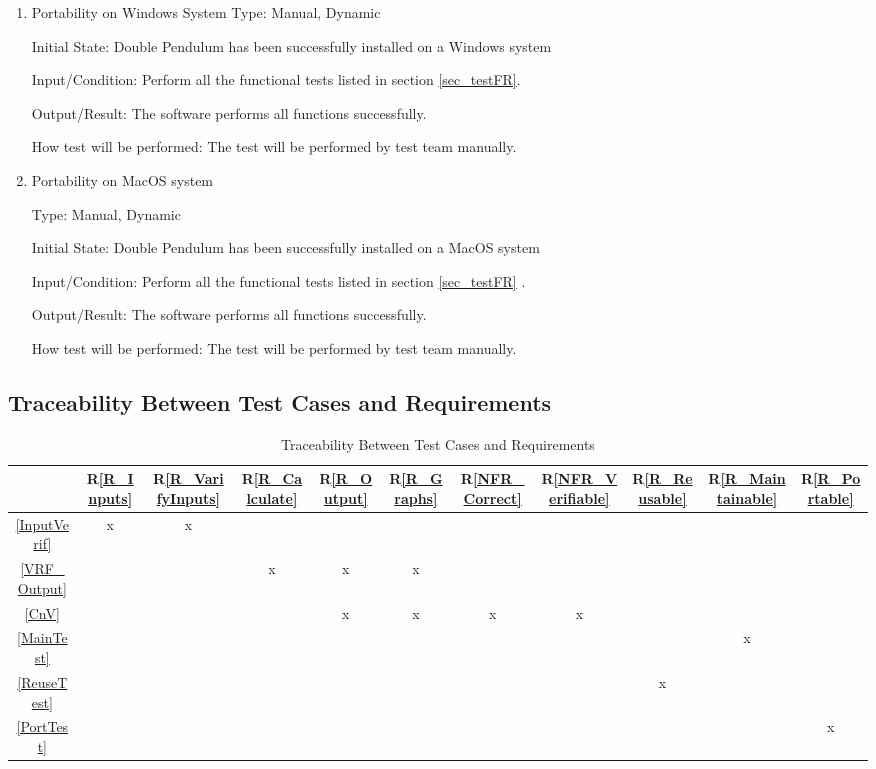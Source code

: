 \documentclass[12pt, titlepage]{article}
\newcommand{\rref}[1]{R\ref{#1}}
\begin{document}
\begin{enumerate}
\item{Portability on Windows System} 
Type: Manual, Dynamic

Initial State: Double Pendulum has been successfully installed on a Windows system
          
Input/Condition: Perform all the functional tests listed in section \ref{sec_testFR}. 
          
Output/Result: The software performs all functions successfully. 

How test will be performed: The test will be performed by test team manually.

\item{Portability on MacOS system}

Type: Manual, Dynamic

Initial State: Double Pendulum has been successfully installed on a MacOS system
          
Input/Condition: Perform all the functional tests listed in section \ref{sec_testFR} . 
          
Output/Result: The software performs all functions successfully. 
          
How test will be performed: The test will be performed by test team manually.

\end{enumerate}


\subsection{Traceability Between Test Cases and Requirements}

\begin{table}[H]
\centering
\begin{tabular}{|c|c|c|c|c|c|c|c|c|c|c|}
\hline
  & \rref{R_Inputs}& \rref{R_VarifyInputs} &  \rref{R_Calculate} & \rref{R_Output}
  & \rref{R_Graphs}& \rref{NFR_Correct}& \rref{NFR_Verifiable} &
                                                                 \rref{R_Reusable}
  & \rref{R_Maintainable} & \rref{R_Portable}\\
  
\hline
\ref{InputVerif}      &x&x&&&&&&&&\\ \hline
\ref{VRF_Output}     &&&x&x&x&&&&&\\ \hline
\ref{CnV}      &&&&x&x&x&x&&&\\ \hline
\ref{MainTest}      &&&&&&&& &x&\\ \hline
\ref{ReuseTest}      &&&&&&&&x&&\\ \hline
\ref{PortTest}      &&&&&&&&&&x\\  
\hline
\end{tabular}
\caption{Traceability Between Test Cases and Requirements}
\label{Table:R_trace}

\end{table}
		
\end{document}
